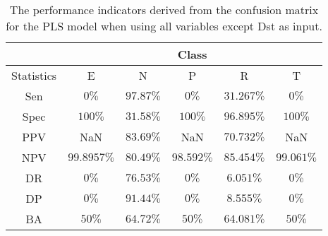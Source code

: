 \begin{table}[!ht]
	\centering
	\begin{tabular}{|c|c|c|c|c|c|}
		\hline
		 & \multicolumn{5}{c|}{Class} \\ \hline
		Statistics & E & N & P & R & T \\ \hline
		Sen & $0\%$ & $97.87\%$ & $0\%$ & $31.267\%$ & $0\%$ \\ \hline
		Spec & $100\%$ & $31.58\%$ & $100\%$ & $96.895\%$ & $100\%$ \\ \hline
		PPV & NaN & $83.69\%$ & NaN & $70.732\%$ & NaN \\ \hline
		NPV & $99.8957\%$ & $80.49\%$ & $98.592\%$ & $85.454\%$ & $99.061\%$ \\ \hline
		DR & $0\%$ & $76.53\%$ & $0\%$ & $6.051\%$ & $0\%$ \\ \hline
		DP & $0\%$ & $91.44\%$ & $0\%$ & $8.555\%$ & $0\%$ \\ \hline
		BA & $50\%$ & $64.72\%$ & $50\%$ & $64.081\%$ & $50\%$ \\ \hline
	\end{tabular}
	\caption{The performance indicators derived from the confusion matrix for the PLS model when using all variables except Dst as input.}
	\label{tab:cs:reverse:noDst:pls}
\end{table}
